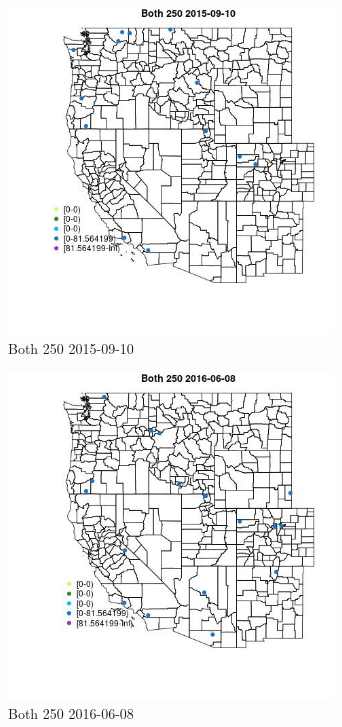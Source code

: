 \begin{figure} 
\centering  
\includegraphics[width=0.77\textwidth]{Code_Outputs/Report_ML_input_PM25_Step4_part_e_de_duplicated_aves_MapObsBoth_2502015-09-10.jpg} 
\caption{\label{fig:Report_ML_input_PM25_Step4_part_e_de_duplicated_avesMapObsBoth_2502015-09-10}Both 250 2015-09-10} 
\end{figure} 
 

\begin{figure} 
\centering  
\includegraphics[width=0.77\textwidth]{Code_Outputs/Report_ML_input_PM25_Step4_part_e_de_duplicated_aves_MapObsBoth_2502016-06-08.jpg} 
\caption{\label{fig:Report_ML_input_PM25_Step4_part_e_de_duplicated_avesMapObsBoth_2502016-06-08}Both 250 2016-06-08} 
\end{figure} 
 


